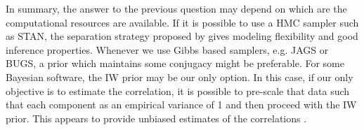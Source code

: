 \documentclass[12pt]{article}
\newcommand{\matt}[1]{\textcolor{red}{(matt: #1)}}
\begin{document}
In summary, the answer to the previous question may depend on which are the computational resources are available. If it is possible to use a HMC sampler such as STAN, the separation strategy proposed by \cite{barnard2000} gives modeling flexibility and good inference properties. Whenever we use Gibbs based samplers, e.g. JAGS or BUGS, a prior which maintains some conjugacy might be preferable. For some Bayesian software, the IW prior may be our only option. In this case, if our only objective is to estimate the correlation, it is possible to pre-scale that data such that each component as an empirical variance of 1 and then proceed with the IW prior. This appears to provide unbiased estimates of the correlations \citep{CCalvarez}. 

      
      
\end{document}
